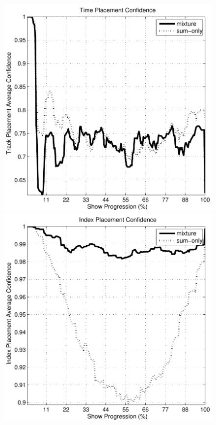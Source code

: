 \documentclass[twocolumn]{article}
\begin{document}
\begin{figure}
	
	\centering
	\includegraphics[scale=0.4]{images/conf/timeplacementconfidence}
	\bigskip
	
	\includegraphics[scale=0.4]{images/conf/indexplacementconfidence}
	\bigskip
	

\end{figure}
\end{document}
